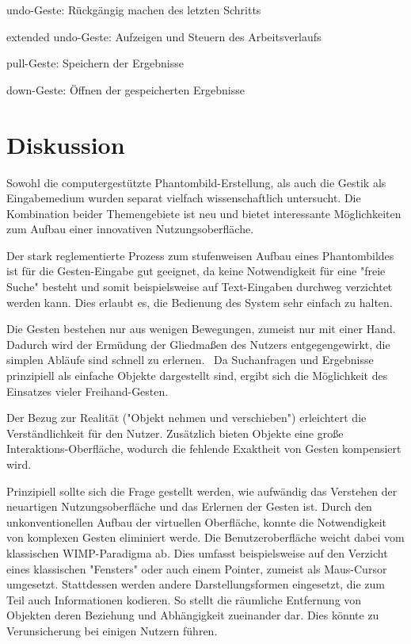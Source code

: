 \documentclass{sigchi-ext}
\begin{document}
undo-Geste: Rückgängig machen des letzten Schritts

extended undo-Geste: Aufzeigen und Steuern des Arbeitsverlaufs 

pull-Geste: Speichern der Ergebnisse

down-Geste: Öffnen der gespeicherten Ergebnisse

\section{Diskussion}
Sowohl die computergestützte Phantombild-Erstellung, als auch die
Gestik als Eingabemedium wurden separat vielfach wissenschaftlich
untersucht. Die Kombination beider Themengebiete ist neu und bietet
interessante Möglichkeiten zum Aufbau einer innovativen
Nutzungsoberfläche. 

Der stark reglementierte Prozess zum stufenweisen Aufbau eines
Phantombildes ist für die Gesten-Eingabe gut geeignet, da keine
Notwendigkeit für eine "freie Suche" besteht und somit beispielsweise auf
Text-Eingaben durchweg verzichtet werden kann. Dies erlaubt es, die Bedienung des
System sehr einfach zu halten.

Die Gesten bestehen nur aus wenigen Bewegungen, zumeist nur mit einer
Hand. Dadurch wird der Ermüdung der Gliedmaßen des Nutzers
entgegengewirkt, die simplen Abläufe sind schnell zu
erlernen.~\cite{vrs:book}
Da Suchanfragen und Ergebnisse prinzipiell
als einfache Objekte dargestellt sind, ergibt sich die Möglichkeit des
Einsatzes vieler Freihand-Gesten.~\cite{3dinteraction:book}

Der Bezug zur Realität ("Objekt nehmen und verschieben") erleichtert die
Verständlichkeit für den Nutzer. Zusätzlich bieten Objekte eine große
Interaktions-Oberfläche, wodurch die fehlende Exaktheit von Gesten
kompensiert wird.~\cite{vrs:book}

Prinzipiell sollte sich die Frage gestellt werden, wie aufwändig das Verstehen
der neuartigen Nutzungsoberfläche und das Erlernen der Gesten ist. 
Durch den unkonventionellen Aufbau der virtuellen Oberfläche, konnte die Notwendigkeit von komplexen Gesten eliminiert werde. Die Benutzeroberfläche weicht dabei vom klassischen WIMP-Paradigma ab. Dies umfasst beispielsweise auf den Verzicht eines klassischen "Fensters" oder auch einem Pointer, zumeist als Maus-Cursor umgesetzt. Stattdessen werden andere Darstellungsformen eingesetzt, die zum Teil auch Informationen kodieren. So stellt die räumliche Entfernung von Objekten deren Beziehung und Abhängigkeit zueinander dar. Dies könnte zu Verunsicherung bei einigen Nutzern führen.
\end{document}

